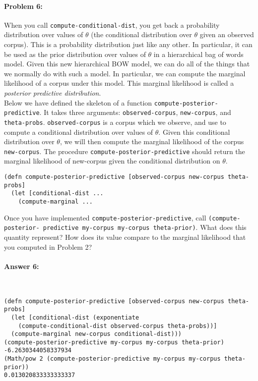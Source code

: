 \documentclass[12pt, letterpaper]{article}
\begin{document}
\hrulefill
\paragraph{Problem 6:}
 
When you call \texttt{compute-conditional-dist}, you get back a
probability distribution over values of $\theta$ (the conditional
distribution over $\theta$ given an observed corpus). This is a
probability distribution just like any other. In particular, it can be
used as the prior distribution over values of $\theta$ in a
hierarchical bag of words model. Given this new hierarchical BOW
model, we can do all of the things that we normally do with such a
model. In particular, we can compute the marginal likelihood of a
corpus under this model. This marginal likelihood is called a
\emph{posterior predictive distribution}.
\\

\noindent Below we have defined the skeleton of a function
\texttt{compute-posterior-predictive}. It takes three arguments:
\texttt{observed-corpus}, \texttt{new-corpus}, and
\texttt{theta-probs}. \texttt{observed-corpus} is a corpus which we
observe, and use to compute a conditional distribution over values of
$\theta$. Given this conditional distribution over $\theta$, we will
then compute the marginal likelihood of the corpus
\texttt{new-corpus}. The procedure
\texttt{compute-posterior-predictive} should return the marginal
likelihood of new-corpus given the conditional distribution on
$\theta$.

\begin{lstlisting}
(defn compute-posterior-predictive [observed-corpus new-corpus theta-probs]
  (let [conditional-dist ...
    (compute-marginal ...
\end{lstlisting}

\noindent Once you have implemented
\texttt{compute-posterior-predictive}, call
\texttt{(compute-posterior- predictive my-corpus my-corpus
  theta-prior)}. What does this quantity represent? How does its value
compare to the marginal likelihood that you computed in Problem 2?

\paragraph{Answer 6:}~\begin{lstlisting}
(defn compute-posterior-predictive [observed-corpus new-corpus theta-probs]
  (let [conditional-dist (exponentiate 
    (compute-conditional-dist observed-corpus theta-probs))]
  (compute-marginal new-corpus conditional-dist)))
(compute-posterior-predictive my-corpus my-corpus theta-prior)
-6.2630344058337934
(Math/pow 2 (compute-posterior-predictive my-corpus my-corpus theta-prior))
0.013020833333333337
\end{lstlisting}
\end{document}
